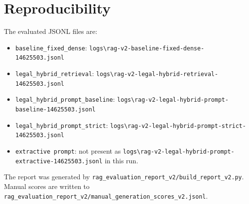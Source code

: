 \documentclass[11pt,a4paper]{article}
\begin{document}
\section{Reproducibility}
The evaluated JSONL files are:
\begin{itemize}[leftmargin=*]
\item \texttt{baseline\_fixed\_dense}: \texttt{logs\textbackslash{}rag-v2-baseline-fixed-dense-14625503.jsonl}
\item \texttt{legal\_hybrid\_retrieval}: \texttt{logs\textbackslash{}rag-v2-legal-hybrid-retrieval-14625503.jsonl}
\item \texttt{legal\_hybrid\_prompt\_baseline}: \texttt{logs\textbackslash{}rag-v2-legal-hybrid-prompt-baseline-14625503.jsonl}
\item \texttt{legal\_hybrid\_prompt\_strict}: \texttt{logs\textbackslash{}rag-v2-legal-hybrid-prompt-strict-14625503.jsonl}
\item \texttt{extractive prompt}: not present as \texttt{logs\textbackslash{}rag-v2-legal-hybrid-prompt-extractive-14625503.jsonl} in this run.
\end{itemize}
The report was generated by \texttt{rag\_evaluation\_report\_v2/build\_report\_v2.py}. Manual scores are written to \texttt{rag\_evaluation\_report\_v2/manual\_generation\_scores\_v2.jsonl}.
\end{document}
